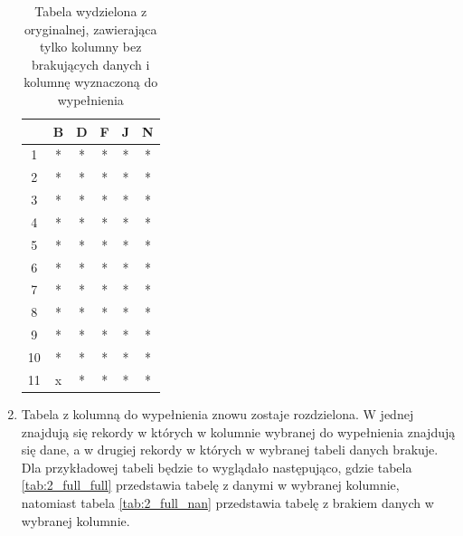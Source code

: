 \documentclass[12pt,twoside]{article}
\begin{document}
\begin{enumerate}[label=\arabic*), leftmargin=1.25cm]
          \begin{table}[ht]
              \caption{Tabela wydzielona z oryginalnej,
                  zawierająca tylko kolumny bez brakujących danych i kolumnę wyznaczoną do wypełnienia}
              \centering
              \begin{tabular}{|c|c|c|c|c|c|}
                  \hline
                     & B & D & F & J & N \\ \hline
                  1  & * & * & * & * & * \\ \hline
                  2  & * & * & * & * & * \\ \hline
                  3  & * & * & * & * & * \\ \hline
                  4  & * & * & * & * & * \\ \hline
                  5  & * & * & * & * & * \\ \hline
                  6  & * & * & * & * & * \\ \hline
                  7  & * & * & * & * & * \\ \hline
                  8  & * & * & * & * & * \\ \hline
                  9  & * & * & * & * & * \\ \hline
                  10 & * & * & * & * & * \\ \hline
                  11 & x & * & * & * & * \\ \hline
              \end{tabular}
              \label{tab:2_full}
          \end{table}
          \FloatBarrier

    \item Tabela z kolumną do wypełnienia znowu zostaje rozdzielona. W jednej znajdują się rekordy
          w których w kolumnie wybranej do wypełnienia znajdują się dane,
          a w drugiej rekordy w których w wybranej tabeli danych brakuje.
          Dla przykładowej tabeli będzie to wyglądało następująco,
          gdzie tabela \ref{tab:2_full_full} przedstawia tabelę z danymi w wybranej kolumnie,
          natomiast tabela \ref{tab:2_full_nan} przedstawia tabelę z brakiem danych w wybranej kolumnie.


\end{enumerate}
\end{document}
